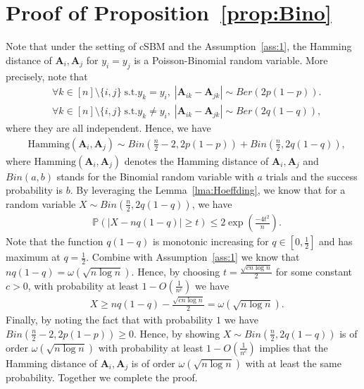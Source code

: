 \documentclass{article} \usepackage{iclr2022_conference,times}
\begin{document}
\section{Proof of Proposition~\ref{prop:Bino}}
Note that under the setting of cSBM and the Assumption~\ref{ass:1}, the Hamming distance of $\mathbf{A}_i,\mathbf{A}_j$ for $y_i=y_j$ is a Poisson-Binomial random variable. More precisely, note that
\begin{align}
	& \forall k\in [n]\setminus \{i,j\}\;\text{s.t.}y_k=y_i,\; |\mathbf{A}_{ik}-\mathbf{A}_{jk}| \sim Ber(2p(1-p)).\\
	&  \forall k\in [n]\setminus \{i,j\}\;\text{s.t.}y_k\neq y_i,\; |\mathbf{A}_{ik}-\mathbf{A}_{jk}| \sim Ber(2q(1-q)),
\end{align}
where they are all independent. Hence, we have
\begin{align}
	& \text{Hamming}(\mathbf{A}_i,\mathbf{A}_j) \sim Bin(\frac{n}{2}-2,2p(1-p)) + Bin(\frac{n}{2},2q(1-q)),
\end{align}
where $\text{Hamming}(\mathbf{A}_i,\mathbf{A}_j)$ denotes the Hamming distance of $\mathbf{A}_i,\mathbf{A}_j$ and $Bin(a,b)$ stands for the Binomial random variable with $a$ trials and the success probability is $b$. By leveraging the Lemma~\ref{lma:Hoeffding}, we know that for a random variable $X\sim Bin(\frac{n}{2},2q(1-q))$, we have
\begin{align}
	& \mathbb{P}\left(|X - nq(1-q)|\geq t\right) \leq 2 \exp(\frac{-4t^2}{n}).
\end{align}
 Note that the function $q(1-q)$ is monotonic increasing for $q\in[0,\frac{1}{2}]$ and has maximum at $q=\frac{1}{2}$. Combine with Assumption~\ref{ass:1} we know that $nq(1-q) = \omega(\sqrt{n\log n})$. Hence, by choosing $t = \frac{\sqrt{c n \log n}}{2}$ for some constant $c>0$, with probability at least $1-O(\frac{1}{n^c})$ we have
 \begin{align}
	& X \geq nq(1-q)-\frac{\sqrt{c n \log n}}{2} = \omega(\sqrt{n\log n}).
\end{align}
Finally, by noting the fact that with probability $1$ we have $Bin(\frac{n}{2}-2,2p(1-p))\geq 0$. Hence, by showing $X\sim Bin(\frac{n}{2},2q(1-q))$ is of order $\omega(\sqrt{n\log n})$ with probability at least $1-O(\frac{1}{n^c})$ implies that the Hamming distance of $\mathbf{A}_i,\mathbf{A}_j$ is of order $\omega(\sqrt{n\log n})$ with at least the same probability. Together we complete the proof.
 
\end{document}

